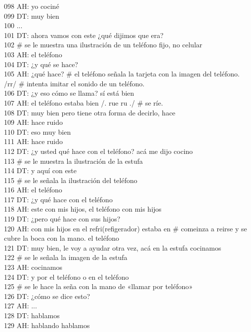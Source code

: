 098 AH: yo cociné \\
099 DT: muy bien\\
100 ...\\
101 DT: ahora vamos con este ¿qué dijimos que era?\\
102 # se le muestra una ilustración de un teléfono fijo, no celular\\
103 AH: el teléfono\\
104 DT: ¿y qué se hace?\\
105 AH: ¿qué hace? # el teléfono señala la tarjeta con la imagen del teléfono. /rr/ # intenta imitar el sonido de un teléfono.\\
106 DT: ¿y eso cómo se llama? sí está bien\\
107 AH: el teléfono estaba bien /. rue ru ./ # se ríe.\\
108 DT: muy bien pero tiene otra forma de decirlo, hace\\
109 AH: hace ruido\\
110 DT: eso muy bien\\
111 AH: hace ruido \\
112 DT: ¿y usted qué hace con el teléfono? acá me dijo cocino\\
113 # se le muestra la ilustración de la estufa\\
114 DT: y aquí con este\\
115 # se le señala la ilustración del teléfono\\
116 AH: el teléfono\\
117 DT: ¿y qué hace con el teléfono\\
118 AH: este con mis hijos, el teléfono con mis hijos\\
119 DT: ¿pero qué hace con sus hijos?\\
120 AH: con mis hijos en el refri(refigerador) estaba en # comeinza a reirse y se cubre la boca con la mano. el teléfono\\
121 DT: muy bien, le voy a ayudar otra vez, acá en la estufa cocinamos\\
122 # se le señala la imagen de la estufa\\
123 AH: cocinamos\\
124 DT: y por el teléfono o en el teléfono\\
125 # se le hace la seña con la mano de «llamar por teléfono»\\
126 DT: ¿cómo se dice esto?\\
127 AH: ...\\
128 DT: hablamos\\
129 AH: hablando hablamos\\
